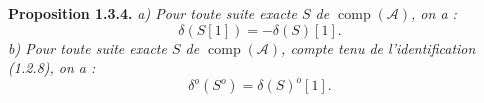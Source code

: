 \medskip\noindent\textbf{Proposition 1.3.4.}\quad
\textit{a) Pour toute suite exacte $S$ de
$\operatorname{comp}(\mathcal A)$, on a :}
\[
\delta(S[1])=-\delta(S)[1].
\]
\noindent\textit{b) Pour toute suite exacte $S$ de
$\operatorname{comp}(\mathcal A)$, compte tenu de l'identification
(1.2.8), on a :}
\[
\delta^o(S^o)=\delta(S)^o[1].
\]
\endgroup
